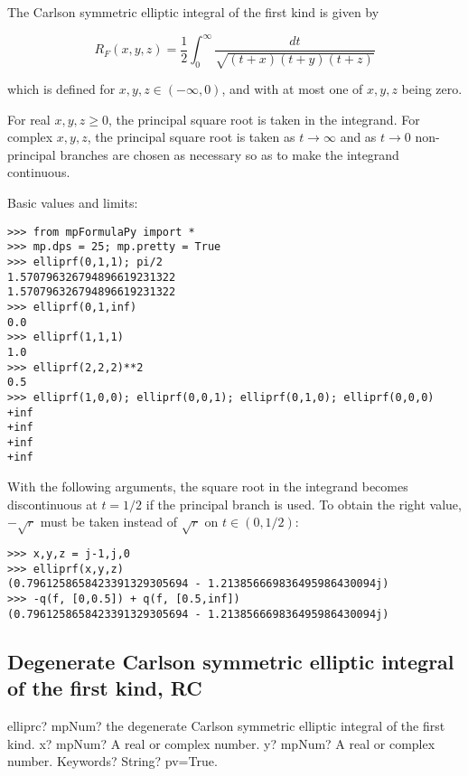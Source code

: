 \vpara
The Carlson symmetric elliptic integral of the first kind is given by

\begin{equation}
R_F(x,y,z)=\frac{1}{2} \int_0^{\infty} \frac{dt}{\sqrt{(t+x)(t+y)(t+z)}}
\end{equation}

which is defined for $x,y,z \in (-\infty, 0)$, and with at most one of $x,y,z$ being zero.

For real $x,y,z \geq 0$, the principal square root is taken in the integrand. For complex $x,y,z$, the principal square root is taken as $t \rightarrow \infty$ and as $t \rightarrow 0$ non-principal branches are chosen as necessary so as to make the integrand continuous.

Basic values and limits:

\begin{lstlisting}
>>> from mpFormulaPy import *
>>> mp.dps = 25; mp.pretty = True
>>> elliprf(0,1,1); pi/2
1.570796326794896619231322
1.570796326794896619231322
>>> elliprf(0,1,inf)
0.0
>>> elliprf(1,1,1)
1.0
>>> elliprf(2,2,2)**2
0.5
>>> elliprf(1,0,0); elliprf(0,0,1); elliprf(0,1,0); elliprf(0,0,0)
+inf
+inf
+inf
+inf
\end{lstlisting}

With the following arguments, the square root in the integrand becomes discontinuous at $t=1/2$ if the principal branch is used. To obtain the right value, $-\sqrt{r}$ must be taken instead of $\sqrt{r}$ on $t \in (0, 1/2)$:

\begin{lstlisting}
>>> x,y,z = j-1,j,0
>>> elliprf(x,y,z)
(0.7961258658423391329305694 - 1.213856669836495986430094j)
>>> -q(f, [0,0.5]) + q(f, [0.5,inf])
(0.7961258658423391329305694 - 1.213856669836495986430094j)
\end{lstlisting}



\subsection{Degenerate Carlson symmetric elliptic integral of the first kind, RC}

\begin{mpFunctionsExtract}
	\mpFunctionThree
	{elliprc? mpNum? the degenerate Carlson symmetric elliptic integral of the first kind.}
	{x? mpNum? A real or complex number.}	
	{y? mpNum? A real or complex number.}
	{Keywords? String? pv=True.}	
\end{mpFunctionsExtract}

